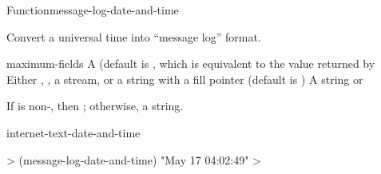 \documentclass[10pt,twoside,english,pdftex]{article}
\begin{document}
\begin{functiondoc}{Function}{message-log-date-and-time}{%
      
    \returns{} }
% 

\fnsyntax

\fnpurpose Convert a universal time into ``message log''
 format.

\fnpackage {}

\fnmodule {}

\fnargs
\begin{args}{maximum-fields}
 A  (default is \nil,
  which is equivalent to the value returned by
\arg[destination] Either \nil, , a stream, or a string with a fill 
pointer (default is \nil)
\arg[result] A string or \nil{}
\end{args}

\fnreturns If  is non-\nil, then \nil; otherwise, a string.

\begin{alsos}{internet-text-date-and-time}
\end{alsos}

\fnexample
%
\W\supp
\begin{example}
  > (message-log-date-and-time)
  "May 17 04:02:49"
  >
\end{example}

\end{functiondoc}

\end{document}
